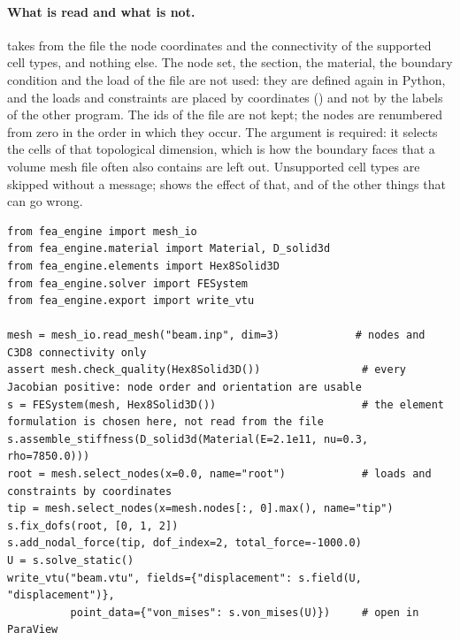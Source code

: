 \paragraph{What is read and what is not.}  takes from the file the node coordinates and the connectivity of the supported cell types, and nothing else. The node set, the section, the material, the boundary condition and the load of the file are not used: they are defined again in Python, and the loads and constraints are placed by coordinates () and not by the labels of the other program. The ids of the file are not kept; the nodes are renumbered from zero in the order in which they occur. The argument  is required: it selects the cells of that topological dimension, which is how the boundary faces that a volume mesh file often also contains are left out. Unsupported cell types are skipped without a message;  shows the effect of that, and of the other things that can go wrong.

\begin{lstlisting}[caption={A mesh from an Abaqus file to a result file (the file \texttt{beam.inp} is the one described above).},label={lst:me-import}]
from fea_engine import mesh_io
from fea_engine.material import Material, D_solid3d
from fea_engine.elements import Hex8Solid3D
from fea_engine.solver import FESystem
from fea_engine.export import write_vtu

mesh = mesh_io.read_mesh("beam.inp", dim=3)            # nodes and C3D8 connectivity only
assert mesh.check_quality(Hex8Solid3D())                # every Jacobian positive: node order and orientation are usable
s = FESystem(mesh, Hex8Solid3D())                       # the element formulation is chosen here, not read from the file
s.assemble_stiffness(D_solid3d(Material(E=2.1e11, nu=0.3, rho=7850.0)))
root = mesh.select_nodes(x=0.0, name="root")            # loads and constraints by coordinates
tip = mesh.select_nodes(x=mesh.nodes[:, 0].max(), name="tip")
s.fix_dofs(root, [0, 1, 2])
s.add_nodal_force(tip, dof_index=2, total_force=-1000.0)
U = s.solve_static()
write_vtu("beam.vtu", fields={"displacement": s.field(U, "displacement")},
          point_data={"von_mises": s.von_mises(U)})     # open in ParaView
\end{lstlisting}

\begin{table}[ht]
\centering\small

\caption{Checks of the import example. Case 1 compares the imported model with the same beam built by , through the displacement of every node, matched by coordinates. Cases 2 to 5 change the file.}\label{tab:me-import}
\end{table}

